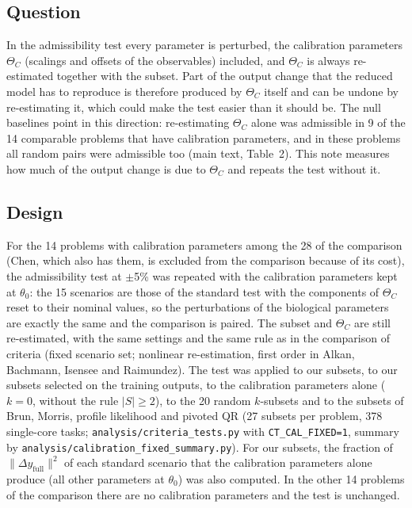 

\subsection*{Question}
In the admissibility test every parameter is perturbed, the calibration parameters $\Theta_C$ (scalings and offsets of the observables) included, and $\Theta_C$ is always re-estimated together with the subset. Part of the output change that the reduced model has to reproduce is therefore produced by $\Theta_C$ itself and can be undone by re-estimating it, which could make the test easier than it should be. The null baselines point in this direction: re-estimating $\Theta_C$ alone was admissible in 9 of the 14 comparable problems that have calibration parameters, and in these problems all random pairs were admissible too (main text, Table~2). This note measures how much of the output change is due to $\Theta_C$ and repeats the test without it.

\subsection*{Design}
For the 14 problems with calibration parameters among the 28 of the comparison (Chen, which also has them, is excluded from the comparison because of its cost), the admissibility test at $\pm$5\% was repeated with the calibration parameters kept at $\theta_0$: the 15 scenarios are those of the standard test with the components of $\Theta_C$ reset to their nominal values, so the perturbations of the biological parameters are exactly the same and the comparison is paired. The subset and $\Theta_C$ are still re-estimated, with the same settings and the same rule as in the comparison of criteria (fixed scenario set; nonlinear re-estimation, first order in Alkan, Bachmann, Isensee and Raimundez). The test was applied to our subsets, to our subsets selected on the training outputs, to the calibration parameters alone ($k=0$, without the rule $|S|\ge2$), to the 20 random $k$-subsets and to the subsets of Brun, Morris, profile likelihood and pivoted QR (27 subsets per problem, 378 single-core tasks; \texttt{analysis/criteria\_tests.py} with \texttt{CT\_CAL\_FIXED=1}, summary by \texttt{analysis/calibration\_fixed\_summary.py}). For our subsets, the fraction of $\|\Delta y_{\mathrm{full}}\|^2$ of each standard scenario that the calibration parameters alone produce (all other parameters at $\theta_0$) was also computed. In the other 14 problems of the comparison there are no calibration parameters and the test is unchanged.

